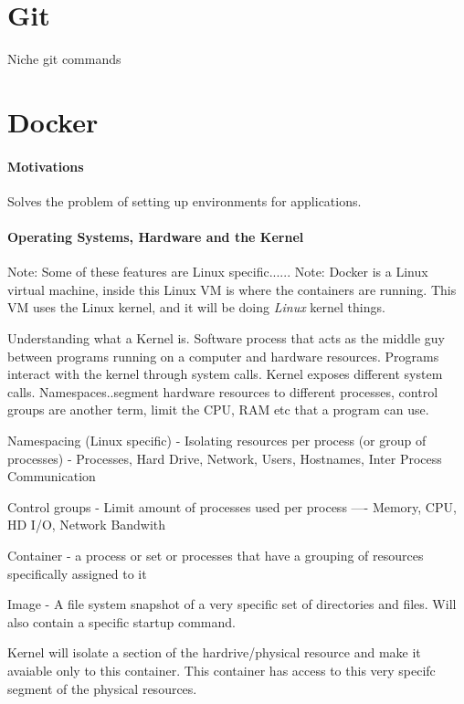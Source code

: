 \documentclass[a4paper, 11pt]{book}
\begin{document}
    \section{Git}

    Niche git commands


    \section{Docker}

    \paragraph{Motivations}
    Solves the problem of setting up environments for applications.

    \paragraph{Operating Systems, Hardware and the Kernel}
    Note: Some of these features are Linux specific......
    Note: Docker is a Linux virtual machine, inside this Linux VM is where the containers are running.
    This VM uses the Linux kernel, and it will be doing \textit{Linux} kernel things.

    Understanding what a Kernel is.
    Software process that acts as the middle guy between programs running on a computer and hardware resources.
    Programs interact with the kernel through system calls.
    Kernel exposes different system calls.
    Namespaces..segment hardware resources to different processes, control groups are another term, limit the CPU, RAM etc that a program can use.

    Namespacing (Linux specific) - Isolating resources per process (or group of processes) - Processes, Hard Drive, Network, Users, Hostnames, Inter Process Communication

    Control groups - Limit amount of processes used per process ---- Memory, CPU, HD I/O, Network Bandwith

    Container - a process or set or processes that have a grouping of resources specifically assigned to it

    Image - A file system snapshot of a very specific set of directories and files.
    Will also contain a specific startup command.

    Kernel will isolate a section of the hardrive/physical resource and make it avaiable only to this container.
    This container has access to this very specifc segment of the physical resources.
\end{document}

